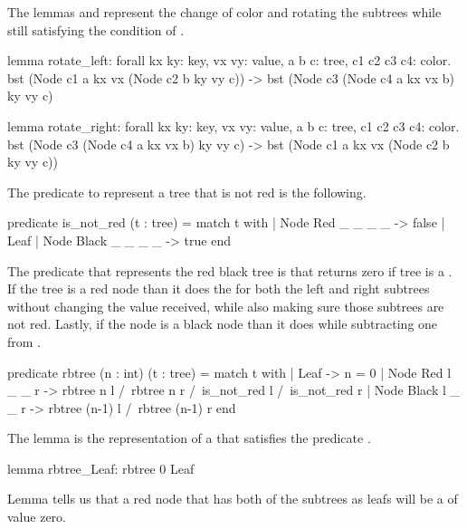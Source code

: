 The lemmas  and  represent the change of color and rotating the subtrees
while still satisfying the condition of .

\begin{whylang}
    lemma rotate_left:
        forall kx ky: key, vx vy: value, a b c: tree, c1 c2 c3 c4: color.
        bst (Node c1 a kx vx (Node c2 b ky vy c)) ->
        bst (Node c3 (Node c4 a kx vx b) ky vy c)

    lemma rotate_right:
        forall kx ky: key, vx vy: value, a b c: tree, c1 c2 c3 c4: color.
        bst (Node c3 (Node c4 a kx vx b) ky vy c) ->
        bst (Node c1 a kx vx (Node c2 b ky vy c))
\end{whylang}

The predicate to represent a tree that is not red is the following.

\begin{whylang}
    predicate is_not_red (t : tree) =
        match t with
        | Node Red _ _ _ _ -> false
        | Leaf | Node Black _ _ _ _ -> true
        end
\end{whylang}

The predicate that represents the red black tree is  that returns zero if tree  is 
a . If the tree is a red node than it does the  for both the left and right
subtrees without changing the value  received, while also making sure those subtrees are not red. Lastly,
if the node is a black node than it does  while subtracting one from .


\begin{whylang}
    predicate rbtree (n : int) (t : tree) =
        match t with
        | Leaf ->
            n = 0
        | Node Red   l _ _ r ->
            rbtree n l /\ rbtree n r /\ is_not_red l /\ is_not_red r
        | Node Black l _ _ r ->
            rbtree (n-1) l /\ rbtree (n-1) r
        end
\end{whylang}

The lemma  is the representation of a  that satisfies the predicate .

\begin{whylang}
    lemma rbtree_Leaf: rbtree 0 Leaf
\end{whylang}

Lemma  tells us that a red node that has both of the subtrees as leafs will be a  of value
zero.

